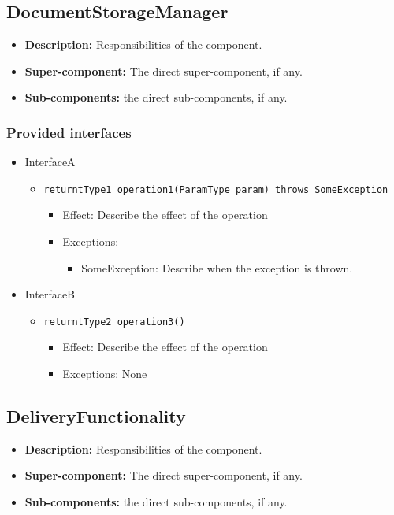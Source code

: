 \documentclass[a4paper,10pt]{article}
\begin{document}
\subsection{DocumentStorageManager}
\begin{itemize}
    \item \textbf{Description:} Responsibilities of the component.
    \item \textbf{Super-component:} The direct super-component, if any.
    \item \textbf{Sub-components:} the direct sub-components, if any.
\end{itemize}

\subsubsection*{Provided interfaces}
\begin{itemize}
    \item InterfaceA
    \begin{itemize}
        \item \texttt{returntType1 operation1(ParamType param) throws SomeException}
        \begin{itemize}
            \item Effect: Describe the effect of the operation
            \item Exceptions:
            \begin{itemize}
                \item SomeException: Describe when the exception is thrown.
            \end{itemize}
        \end{itemize}
    \end{itemize}

    \item InterfaceB
    \begin{itemize}
        \item \texttt{returntType2 operation3()}
        \begin{itemize}
            \item Effect: Describe the effect of the operation
            \item Exceptions: None
        \end{itemize}
    \end{itemize}
\end{itemize}

\subsection{DeliveryFunctionality}
\begin{itemize}
    \item \textbf{Description:} Responsibilities of the component.
    \item \textbf{Super-component:} The direct super-component, if any.
    \item \textbf{Sub-components:} the direct sub-components, if any.
\end{itemize}
\end{document}
